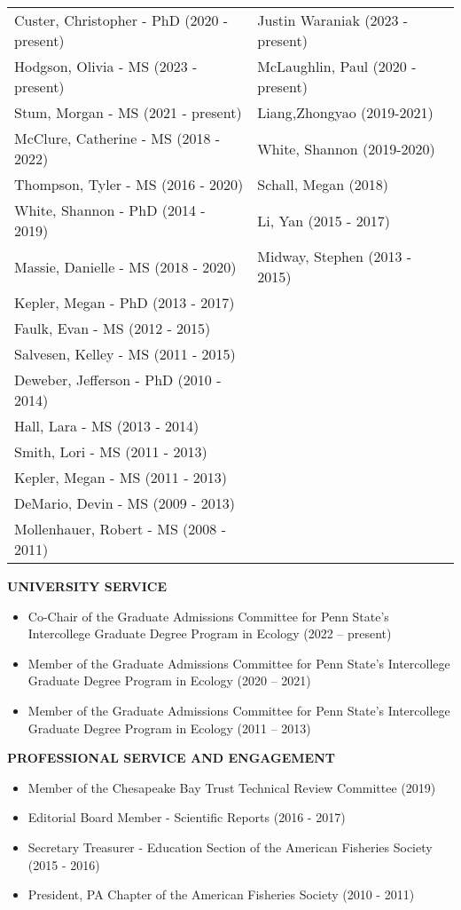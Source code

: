 \documentclass[10pt]{article}
\begin{document}
\begin{flushleft}
\begin{tabularx}{\textwidth}{ XX }
Custer, Christopher - PhD (2020 - present) &  Justin Waraniak (2023 - present)\\
Hodgson, Olivia - MS (2023 - present)  & McLaughlin, Paul (2020 - present)\\
Stum, Morgan - MS (2021 - present)  & Liang,Zhongyao (2019-2021)\\
McClure, Catherine - MS (2018 - 2022) & White, Shannon (2019-2020)\\
Thompson, Tyler - MS (2016 - 2020) &    Schall, Megan (2018)\\
White, Shannon - PhD (2014 - 2019)  & Li, Yan (2015 - 2017) \\
Massie, Danielle - MS (2018 - 2020) &  Midway, Stephen (2013 - 2015)\\
Kepler, Megan - PhD (2013 - 2017) & \\
Faulk, Evan - MS (2012 - 2015) &  \\
Salvesen, Kelley - MS (2011 - 2015) & \\
Deweber, Jefferson - PhD (2010 - 2014) & \\
Hall, Lara - MS (2013 - 2014) & \\
Smith, Lori - MS (2011 - 2013) & \\
Kepler, Megan - MS (2011 - 2013) & \\
DeMario, Devin - MS (2009 - 2013) & \\
Mollenhauer, Robert - MS (2008 - 2011) & \\
\end{tabularx}



\end{flushleft}

\centerline {\bf{UNIVERSITY SERVICE}}
\vspace{5pt}
\begin{itemize}
\item Co-Chair of the Graduate Admissions Committee for Penn State's Intercollege Graduate Degree Program in Ecology (2022 -- present)
\item Member of the Graduate Admissions Committee for Penn State's Intercollege Graduate Degree Program in Ecology (2020 -- 2021)
\item Member of the Graduate Admissions Committee for Penn State's Intercollege Graduate Degree Program in Ecology (2011 -- 2013) 
\end{itemize}

\centerline {\bf{PROFESSIONAL SERVICE AND ENGAGEMENT}}
\vspace{5pt}
\begin{itemize}
\item Member of the Chesapeake Bay Trust Technical Review Committee (2019)
\item Editorial Board Member - Scientific Reports (2016 - 2017)
\item Secretary Treasurer - Education Section of the American Fisheries Society (2015 - 2016)
\item President, PA Chapter of the American Fisheries Society (2010 - 2011)
\end{itemize}
\end{document}
